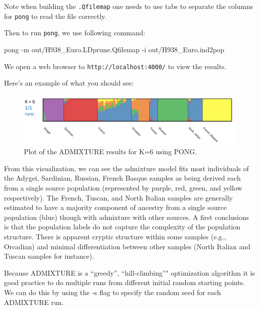 \documentclass[smallextended]{svmult}       %
\newenvironment{Shaded}{\begin{snugshade}}{\end{snugshade}}
\newcommand{\KeywordTok}[1]{\textcolor[rgb]{0.13,0.29,0.53}{\textbf{#1}}}
\newcommand{\DataTypeTok}[1]{\textcolor[rgb]{0.13,0.29,0.53}{#1}}
\newcommand{\CommentTok}[1]{\textcolor[rgb]{0.56,0.35,0.01}{\textit{#1}}}
\newcommand{\FunctionTok}[1]{\textcolor[rgb]{0.00,0.00,0.00}{#1}}
\newcommand{\VariableTok}[1]{\textcolor[rgb]{0.00,0.00,0.00}{#1}}
\newcommand{\ExtensionTok}[1]{#1}
\newcommand{\NormalTok}[1]{#1}
\begin{document}
Note when building the \texttt{.Qfilemap} one needs to use tabs to
separate the columns for \texttt{pong} to read the file correctly.

Then to run \texttt{pong}, we use following command:

\begin{Shaded}
\begin{Highlighting}[]
\ExtensionTok{pong}\NormalTok{ -m out/H938_Euro.LDprune.Qfilemap -i out/H938_Euro.ind2pop}
\end{Highlighting}
\end{Shaded}

We open a web browser to \texttt{http://localhost:4000/} to view the
results.

Here's an example of what you should see:

\begin{figure}
\includegraphics[width=1\linewidth]{./plot/H938_Euro_LDprune_K6} \caption{Plot of the ADMIXTURE results for K=6 using PONG.}\label{fig:unnamed-chunk-7}
\end{figure}

From this visualization, we can see the admixture model fits most
individuals of the Adygei, Sardinian, Russian, French Basque samples as
being derived each from a single source population (represented by
purple, red, green, and yellow respectively). The French, Tuscan, and
North Italian samples are generally estimated to have a majority
component of ancestry from a single source population (blue) though with
admixture with other sources. A first conclusions is that the population
labels do not capture the complexity of the population structure. There
is apparent cryptic structure within some samples (e.g., Orcadian) and
minimal differentiation between other samples (North Italian and Tuscan
samples for instance).

Because ADMIXTURE is a ``greedy'', ``hill-climbing''" optimization
algorithm it is good practice to do multiple runs from different initial
random starting points. We can do this by using the -s flag to specify
the random seed for each ADMIXTURE run.

\begin{Shaded}
\end{Shaded}
\end{document}
